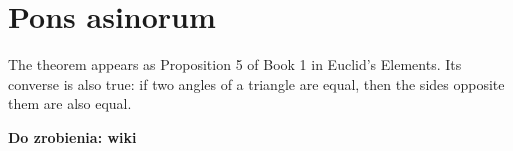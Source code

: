 \section{Pons asinorum}
The theorem appears as Proposition 5 of Book 1 in Euclid's Elements. Its converse is also true: if two angles of a triangle are equal, then the sides opposite them are also equal. 

\textbf{Do zrobienia: wiki}
